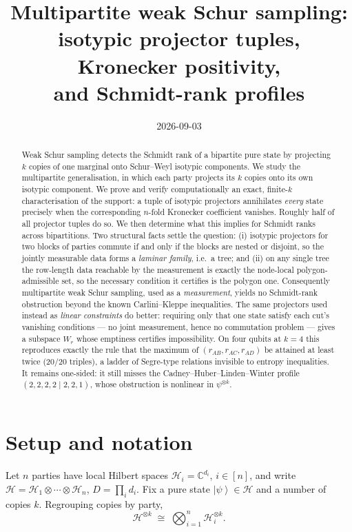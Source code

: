 \documentclass[11pt]{article}
\title{Multipartite weak Schur sampling:\\
       isotypic projector tuples, Kronecker positivity,\\
       and Schmidt-rank profiles}
\author{}
\date{2026-09-03}
\theoremstyle{definition}
\theoremstyle{remark}
\newcommand{\Cx}{\mathbb{C}}
\newcommand{\Hil}{\mathcal{H}}
\newcommand{\ket}[1]{\left|#1\right\rangle}
\begin{document}
\maketitle

\begin{abstract}
Weak Schur sampling detects the Schmidt rank of a bipartite pure state by projecting
$k$ copies of one marginal onto Schur--Weyl isotypic components. We study the
multipartite generalisation, in which each party projects its $k$ copies onto its own
isotypic component. We prove and verify computationally an exact, finite-$k$
characterisation of the support: a tuple of isotypic projectors annihilates
\emph{every} state precisely when the corresponding $n$-fold Kronecker coefficient
vanishes. Roughly half of all projector tuples do so. We then determine what this
implies for Schmidt ranks across bipartitions. Two structural facts settle the
question: (i) isotypic projectors for two blocks of parties commute if and only if the
blocks are nested or disjoint, so the jointly measurable data forms a \emph{laminar
family}, i.e.\ a tree; and (ii) on any single tree the row-length data reachable by the
measurement is exactly the node-local polygon-admissible set, so the necessary condition
it certifies is the polygon one. Consequently multipartite weak Schur sampling, used as
a \emph{measurement}, yields no Schmidt-rank obstruction beyond the known
Carlini--Kleppe inequalities. The same projectors used instead as \emph{linear
constraints} do better: requiring only that one state satisfy each cut's vanishing
conditions --- no joint measurement, hence no commutation problem --- gives a subspace
$W_r$ whose emptiness certifies impossibility. On four qubits at $k=4$ this reproduces
exactly the rule that the maximum of $(r_{AB},r_{AC},r_{AD})$ be attained at least twice
(20/20 triples), a ladder of Segre-type relations invisible to entropy inequalities. It
remains one-sided: it still misses the Cadney--Huber--Linden--Winter profile
$(2,2,2,2 \mid 2,2,1)$, whose obstruction is nonlinear in $\psi^{\otimes k}$.
\end{abstract}

\tableofcontents

\section{Setup and notation}
\label{sec:setup}

Let $n$ parties have local Hilbert spaces $\Hil_i = \Cx^{d_i}$, $i \in [n]$, and write
$\Hil = \Hil_1 \otimes \cdots \otimes \Hil_n$, $D = \prod_i d_i$. Fix a pure state
$\ket{\psi} \in \Hil$ and a number of copies $k$. Regrouping copies by party,
\begin{equation}
  \Hil^{\otimes k} \;\cong\; \bigotimes_{i=1}^n \Hil_i^{\otimes k}.
  \label{eq:regroup}
\end{equation}
\end{document}
